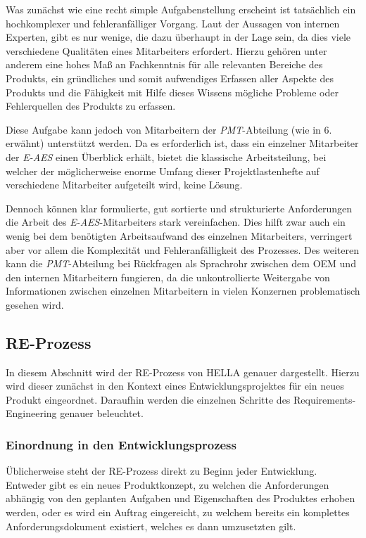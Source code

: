 \documentclass[12pt]{report}
\begin{document}
Was zunächst wie eine recht simple Aufgabenstellung erscheint ist tatsächlich ein hochkomplexer und fehleranfälliger Vorgang. Laut der Aussagen von internen Experten, gibt es nur wenige, die dazu überhaupt in der Lage sein, da dies viele verschiedene Qualitäten eines Mitarbeiters erfordert. Hierzu gehören unter anderem eine hohes Maß an Fachkenntnis für alle relevanten Bereiche des Produkts, ein gründliches und somit aufwendiges Erfassen aller Aspekte des Produkts und die Fähigkeit mit Hilfe dieses Wissens mögliche Probleme oder Fehlerquellen des Produkts zu erfassen. 

Diese Aufgabe kann jedoch von Mitarbeitern der \textit{PMT}-Abteilung (wie in 6. erwähnt) unterstützt werden. Da es erforderlich ist, dass ein einzelner Mitarbeiter der \textit{E-AES} einen Überblick erhält, bietet die klassische Arbeitsteilung, bei welcher der möglicherweise enorme Umfang dieser Projektlastenhefte auf verschiedene Mitarbeiter aufgeteilt wird, keine Lösung.

Dennoch können klar formulierte, gut sortierte und strukturierte Anforderungen die Arbeit des \textit{E-AES}-Mitarbeiters stark vereinfachen. Dies hilft zwar auch ein wenig bei dem benötigten Arbeitsaufwand des einzelnen Mitarbeiters, verringert aber vor allem die Komplexität und Fehleranfälligkeit des Prozesses. Des weiteren kann die \textit{PMT}-Abteilung bei Rückfragen als Sprachrohr zwischen dem OEM und den internen Mitarbeitern fungieren, da die unkontrollierte Weitergabe von Informationen zwischen einzelnen Mitarbeitern in vielen Konzernen problematisch gesehen wird. 
\subsection{RE-Prozess}
In diesem Abschnitt wird der RE-Prozess von HELLA genauer dargestellt. Hierzu wird dieser zunächst in den Kontext eines Entwicklungsprojektes für ein neues Produkt eingeordnet. Daraufhin werden die einzelnen Schritte des Requirements-Engineering genauer beleuchtet. 

\subsubsection{Einordnung in den Entwicklungsprozess}
Üblicherweise steht der RE-Prozess direkt zu Beginn jeder Entwicklung. Entweder gibt es ein neues Produktkonzept, zu welchen die Anforderungen abhängig von den geplanten Aufgaben und Eigenschaften des Produktes erhoben werden, oder es wird ein Auftrag eingereicht, zu welchem bereits ein komplettes Anforderungsdokument existiert, welches es dann umzusetzten gilt.
\end{document}
